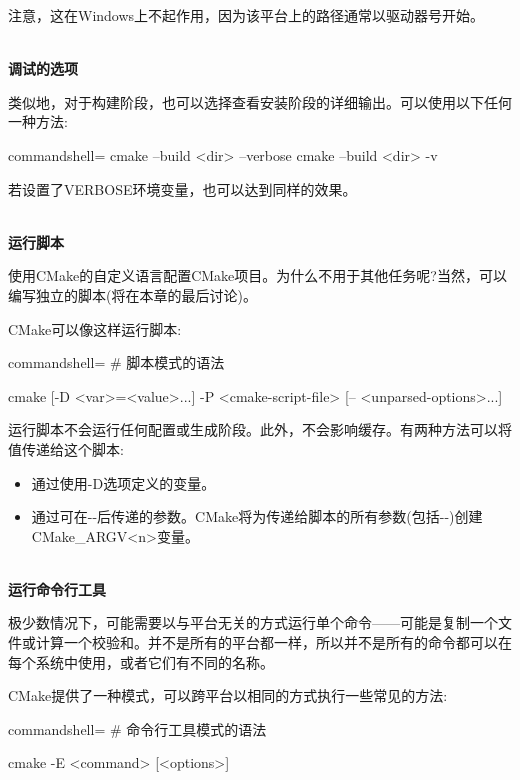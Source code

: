 注意，这在Windows上不起作用，因为该平台上的路径通常以驱动器号开始。

\hspace*{\fill} \\ %
\noindent
\textbf{调试的选项}

类似地，对于构建阶段，也可以选择查看安装阶段的详细输出。可以使用以下任何一种方法:

\begin{tcblisting}{commandshell={}}
cmake --build <dir> --verbose
cmake --build <dir> -v
\end{tcblisting}

若设置了VERBOSE环境变量，也可以达到同样的效果。

\hspace*{\fill} \\ %
\noindent
\textbf{运行脚本}
 
使用CMake的自定义语言配置CMake项目。为什么不用于其他任务呢?当然，可以编写独立的脚本(将在本章的最后讨论)。

CMake可以像这样运行脚本:

\begin{tcblisting}{commandshell={}}
# 脚本模式的语法

cmake [{-D <var>=<value>}...] -P <cmake-script-file>
      [-- <unparsed-options>...]
\end{tcblisting}

运行脚本不会运行任何配置或生成阶段。此外，不会影响缓存。有两种方法可以将值传递给这个脚本:

\begin{itemize}
\item 
通过使用-D选项定义的变量。

\item 
通过可在-{}-后传递的参数。CMake将为传递给脚本的所有参数(包括-{}-)创建CMake\_ARGV<n>变量。
\end{itemize}

\hspace*{\fill} \\ %
\noindent
\textbf{运行命令行工具}

极少数情况下，可能需要以与平台无关的方式运行单个命令——可能是复制一个文件或计算一个校验和。并不是所有的平台都一样，所以并不是所有的命令都可以在每个系统中使用，或者它们有不同的名称。

CMake提供了一种模式，可以跨平台以相同的方式执行一些常见的方法:

\begin{tcblisting}{commandshell={}}
# 命令行工具模式的语法

cmake -E <command> [<options>]
\end{tcblisting}

